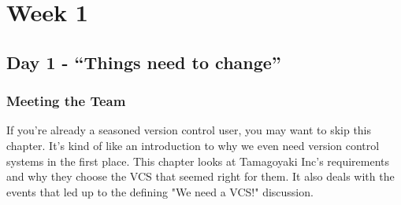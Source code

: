 \chapter{Week 1}
\section{Day 1 - ``Things need to change''}
\subsection{Meeting the Team}

If you're already a seasoned version control user, you may want to skip this chapter.  It's kind of like an introduction to why we even need version control systems in the first place.  This chapter looks at Tamagoyaki Inc's requirements and why they choose the VCS that seemed right for them.  It also deals with the events that led up to the defining "We need a VCS!" discussion.

